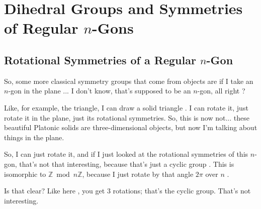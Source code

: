 \begin{hidden}
\end{hidden}

\section{Dihedral Groups and Symmetries of Regular \texorpdfstring{$n$}{n}-Gons}

\subsection{Rotational Symmetries of a Regular \texorpdfstring{$n$}{n}-Gon}

\begin{speech}[00:25:16 - 00:26:09]
So, some more classical symmetry groups that come from objects are if I take an $n$-gon in the plane ... I don't know, that's supposed to be an $n$-gon, all right ?

Like, for example, the triangle, I can draw a solid triangle . I can rotate it, just rotate it in the plane, just its rotational symmetries. So, this is now not... these beautiful Platonic solids are three-dimensional objects, but now I'm talking about things in the plane.

So, I can just rotate it, and if I just looked at the rotational symmetries of this $n$-gon, that's not that interesting, because that's just a cyclic group . This is isomorphic to $\mathbb{Z} \bmod n\mathbb{Z}$, because I just rotate by that angle $2\pi$ over $n$ .

Is that clear? Like here , you get $3$ rotations; that's the cyclic group. That's not interesting.
\end{speech}

